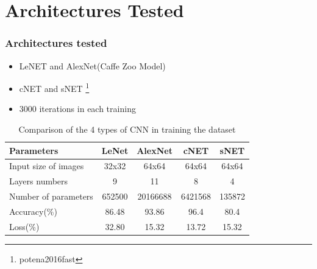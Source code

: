 \documentclass[10pt,a4paper]{beamer}
\begin{document}
\section{Architectures Tested}
\begin{frame}
\frametitle{Architectures tested}
\begin{itemize}
	\item LeNET and AlexNet(Caffe Zoo Model) \
	\item cNET and sNET \footnote{potena2016fast}
	\item 3000 iterations in each training
\end{itemize}
\begin{table}[h!]
\centering
\renewcommand{\arraystretch}{1.2}
\caption{Comparison of the 4 types of CNN in training the dataset}
\label{table:2}
\begin{tabular}{|l c c c c|} 
 \hline
 \textbf{Parameters }& \textbf{LeNet} & \textbf{AlexNet} & \textbf{cNET} & \textbf{sNET} \\ [0.75ex] 
 \hline
 Input size of images & 32x32 & 64x64 & 64x64 & 64x64 \\ 
 Layers numbers & 9 & 11 & 8 & 4\\
 Number of parameters & 652500 & 20166688 & 6421568 & 135872 \\ 
 Accuracy(\%) & 86.48 & 93.86 & 96.4 & 80.4 \\
 Loss(\%) & 32.80 & 15.32 & 13.72 & 15.32 \\ [1ex] 
 \hline 
\end{tabular}
\end{table}
\end{frame}
\end{document}
